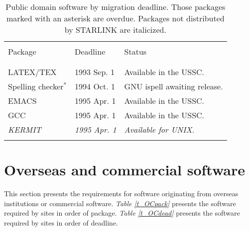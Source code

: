 \begin{table}
\begin{center}
\caption{Public domain software by migration deadline.
Those packages marked with an asterisk are overdue.
Packages not distributed by STARLINK are italicized.}
\vspace{5mm}
\begin{tabular}{|p{36mm}|p{30mm}|p{60mm}|} \hline \label{t_PDdead}
& & \\
Package & Deadline & Status \\
& & \\ \hline
& & \\
LATEX/TEX                 & 1993 Sep. 1      & Available in the USSC. \\
Spelling checker$^{\ast}$ & 1994 Oct. 1      & GNU ispell awaiting release. \\
EMACS                     & 1995 Apr. 1      & Available in the USSC. \\
GCC                       & 1995 Apr. 1      & Available in the USSC. \\
{\em KERMIT}              & {\em 1995 Apr. 1} & {\em Available for UNIX.} \\
& & \\ \hline
\end{tabular}
\end{center}
\end{table}

\newpage
\section{Overseas and commercial software}

This section presents the requirements for software originating from overseas
institutions or commercial software.
{\em Table \ref{t_OCpack}} presents the software required by sites in
order of package.
{\em Table \ref{t_OCdead}} presents the software required by sites in
order of deadline.

